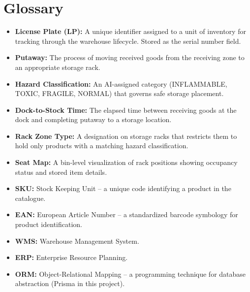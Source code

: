\documentclass[12pt,a4paper]{report}
\begin{document}
\section{Glossary}
\begin{itemize}
    \item \textbf{License Plate (LP):} A unique identifier assigned to a unit of inventory for tracking through the warehouse lifecycle. Stored as the serial number field.
    \item \textbf{Putaway:} The process of moving received goods from the receiving zone to an appropriate storage rack.
    \item \textbf{Hazard Classification:} An AI-assigned category (INFLAMMABLE, TOXIC, FRAGILE, NORMAL) that governs safe storage placement.
    \item \textbf{Dock-to-Stock Time:} The elapsed time between receiving goods at the dock and completing putaway to a storage location.
    \item \textbf{Rack Zone Type:} A designation on storage racks that restricts them to hold only products with a matching hazard classification.
    \item \textbf{Seat Map:} A bin-level visualization of rack positions showing occupancy status and stored item details.
    \item \textbf{SKU:} Stock Keeping Unit -- a unique code identifying a product in the catalogue.
    \item \textbf{EAN:} European Article Number -- a standardized barcode symbology for product identification.
    \item \textbf{WMS:} Warehouse Management System.
    \item \textbf{ERP:} Enterprise Resource Planning.
    \item \textbf{ORM:} Object-Relational Mapping -- a programming technique for database abstraction (Prisma in this project).
\end{itemize}
\end{document}
